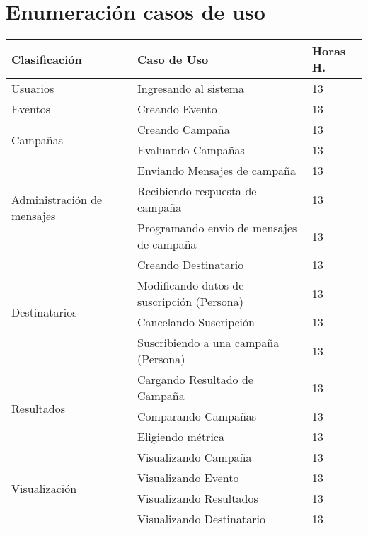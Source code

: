 \documentclass[a4paper, 11pt]{article}
\begin{document}
\newpage
\section{Enumeraci\'on casos de uso}


\begin{table}[H]
\centering
\begin{tabular}{ | p{5cm} | p{8cm} | p{1.5cm} | }
\hline
Clasificación & Caso de Uso & Horas H.\\ \hline \hline
Usuarios & Ingresando al sistema & 13 \\ \hline
Eventos & Creando Evento & 13 \\ \hline
\multirow{2}{5cm}{Campañas} & Creando Campaña & 13 \\ \cline{2-3} 
& Evaluando Campañas & 13 \\ \hline
\multirow{3}{5cm}{Administración de mensajes} & Enviando Mensajes de campaña & 13 \\ \cline{2-3} 
& Recibiendo respuesta de campaña & 13 \\ \cline{2-3} 
& Programando envio de mensajes de campaña & 13 \\ \hline
\multirow{4}{5cm}{Destinatarios} & Creando Destinatario & 13 \\  \cline{2-3} 
& Modificando datos de suscripci\'on (Persona) & 13 \\ \cline{2-3} 
& Cancelando Suscripci\'on & 13 \\ \cline{2-3} 
& Suscribiendo a una campaña (Persona) & 13 \\ \hline 
\multirow{3}{5cm}{Resultados} & Cargando Resultado de Campaña & 13 \\ \cline{2-3} 
& Comparando Campañas & 13 \\ \cline{2-3} 
& Eligiendo métrica & 13 \\ \hline
\multirow{4}{5cm}{Visualización} & Visualizando Campaña & 13 \\ \cline{2-3} 
& Visualizando Evento & 13 \\ \cline{2-3} 
& Visualizando Resultados & 13 \\ \cline{2-3} 
& Visualizando Destinatario & 13 \\ \hline

\end{tabular}
\end{table}
\end{document}
